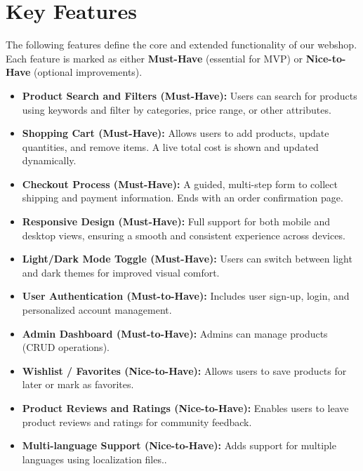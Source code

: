 \documentclass[a4paper,12pt]{article}
\begin{document}
	\section{Key Features}


The following features define the core and extended functionality of our webshop. Each feature is marked as either \textbf{Must-Have} (essential for MVP) or \textbf{Nice-to-Have} (optional improvements).


\begin{itemize}
    \item \textbf{Product Search and Filters (Must-Have):}
    Users can search for products using keywords and filter by categories, price range, or other attributes.

    \item \textbf{Shopping Cart (Must-Have):}
    Allows users to add products, update quantities, and remove items. A live total cost is shown and updated dynamically.

    \item \textbf{Checkout Process (Must-Have):}
    A guided, multi-step form to collect shipping and payment information. Ends with an order confirmation page.

    \item \textbf{Responsive Design (Must-Have):}
    Full support for both mobile and desktop views, ensuring a smooth and consistent experience across devices.

    \item \textbf{Light/Dark Mode Toggle (Must-Have):}
    Users can switch between light and dark themes for improved visual comfort.

    \item \textbf{User Authentication (Must-to-Have):}
    Includes user sign-up, login, and personalized account management.

    \item \textbf{Admin Dashboard (Must-to-Have):}
    Admins can manage products (CRUD operations).




    \item \textbf{Wishlist / Favorites (Nice-to-Have):}
    Allows users to save products for later or mark as favorites.




    \item \textbf{Product Reviews and Ratings (Nice-to-Have):}
    Enables users to leave product reviews and ratings for community feedback.


    \item \textbf{Multi-language Support (Nice-to-Have):}
    Adds support for multiple languages using localization files..

\end{itemize}
\end{document}
